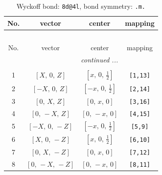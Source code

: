 \documentclass[fleqn,8pt]{jsarticle}
\begin{document}
\begin{longtable}{cccc}
\caption{Wyckoff bond: {\tt 8d@4l}, bond symmetry: {\tt .m.}}
 \\
 \hline \hline
No. & vector & center & mapping \\ \hline \endfirsthead

\multicolumn{3}{l}{\tablename\ \thetable{}} \\
 \hline \hline
No. & vector & center & mapping \\ \hline \endhead

 \hline \hline
\multicolumn{3}{r}{\footnotesize\it continued ...} \\ \endfoot

 \hline \hline
\multicolumn{3}{r}{} \\ \endlastfoot

1 & $\left[ X,\, 0,\, Z \right]$ & $\left[ x,\, 0,\, \frac{1}{2} \right]$ & {\tt [1,13]} \\ \hline
2 & $\left[ - X,\, 0,\, Z \right]$ & $\left[ - x,\, 0,\, \frac{1}{2} \right]$ & {\tt [2,14]} \\ \hline
3 & $\left[ 0,\, X,\, Z \right]$ & $\left[ 0,\, x,\, 0 \right]$ & {\tt [3,16]} \\ \hline
4 & $\left[ 0,\, - X,\, Z \right]$ & $\left[ 0,\, - x,\, 0 \right]$ & {\tt [4,15]} \\ \hline
5 & $\left[ - X,\, 0,\, - Z \right]$ & $\left[ - x,\, 0,\, \frac{1}{2} \right]$ & {\tt [5,9]} \\ \hline
6 & $\left[ X,\, 0,\, - Z \right]$ & $\left[ x,\, 0,\, \frac{1}{2} \right]$ & {\tt [6,10]} \\ \hline
7 & $\left[ 0,\, X,\, - Z \right]$ & $\left[ 0,\, x,\, 0 \right]$ & {\tt [7,12]} \\ \hline
8 & $\left[ 0,\, - X,\, - Z \right]$ & $\left[ 0,\, - x,\, 0 \right]$ & {\tt [8,11]} \\
\end{longtable}
\renewcommand{\arraystretch}{1.2}
\end{document}
